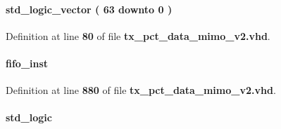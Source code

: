 \paragraph[{fifo1\+\_\+samplenr\+\_\+d1}]{ {\bfseries \textcolor{comment}{std\+\_\+logic\+\_\+vector}\textcolor{vhdlchar}{ }\textcolor{vhdlchar}{(}\textcolor{vhdlchar}{ }\textcolor{vhdlchar}{ } \textcolor{vhdldigit}{63} \textcolor{vhdlchar}{ }\textcolor{keywordflow}{downto}\textcolor{vhdlchar}{ }\textcolor{vhdlchar}{ } \textcolor{vhdldigit}{0} \textcolor{vhdlchar}{ }\textcolor{vhdlchar}{)}\textcolor{vhdlchar}{ }} \hspace{0.3cm}{\ttfamily [Signal]}}\label{classtx__pct__data__mimo__v2_1_1arch_adf44f74144b1ef53009b930e7282e3a5}


Definition at line {\bf 80} of file {\bf tx\+\_\+pct\+\_\+data\+\_\+mimo\+\_\+v2.\+vhd}.

\paragraph[{fifo2}]{ {\bfseries \textcolor{vhdlchar}{fifo\+\_\+inst}\textcolor{vhdlchar}{ }} \hspace{0.3cm}{\ttfamily [Instantiation]}}\label{classtx__pct__data__mimo__v2_1_1arch_a2846f235757aa6eda444fa09ff9b14b5}


Definition at line {\bf 880} of file {\bf tx\+\_\+pct\+\_\+data\+\_\+mimo\+\_\+v2.\+vhd}.

\paragraph[{fifo2\+\_\+data\+\_\+rdy}]{ {\bfseries \textcolor{comment}{std\+\_\+logic}\textcolor{vhdlchar}{ }} \hspace{0.3cm}{\ttfamily [Signal]}}\label{classtx__pct__data__mimo__v2_1_1arch_a13742a591d6ff1cbfe125d27abfb4a4a}


